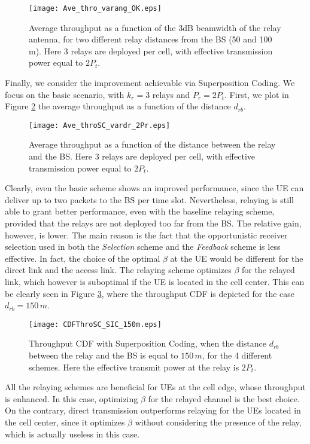 \documentclass[12pt, letterpaper, onecolumn, draftcls]{IEEEtran}
\newcommand{\figw}{0.55\columnwidth}
\begin{document}
\begin{figure}
    \centering
     \texttt{[image: Ave\_thro\_varang\_OK.eps]}
     \caption{\small Average throughput as a function of the 3dB beamwidth of the relay antenna, for two different relay distances from the BS (50 and 100 m). Here 3 relays are deployed per cell, with effective transmission power equal to $2P_t$.}
\label{fig:Ave_thro_varang}
\end{figure}

Finally, we consider the improvement achievable via Superposition Coding. We focus on the basic scenario, with $k_r=3$ relays and $P_r = 2P_t$. First, we plot in Figure \ref{fig:Ave_throSC_vardr_2Pr} the average throughput as a function of the distance $d_{rb}$.
\begin{figure}
    \centering
     \texttt{[image: Ave\_throSC\_vardr\_2Pr.eps]}
     \vspace{-0.5cm}
     \caption{\small Average throughput as a function of the distance between the relay and the BS. Here 3 relays are deployed per cell, with effective transmission power equal to $2P_t$.}
\label{fig:Ave_throSC_vardr_2Pr}
\end{figure}
Clearly, even the basic scheme shows an improved performance, since the UE can deliver up to two packets to the BS per time slot. Nevertheless, relaying is still able to grant better performance, even with the baseline relaying scheme, provided that the relays are not deployed too far from the BS.
The relative gain, however, is lower. The main reason is the fact that the opportunistic receiver selection used in both the \textit{Selection} scheme and the \textit{Feedback} scheme is less effective. In fact, the choice of the optimal $\beta$ at the UE would be different for the direct link and the access link. The relaying scheme optimizes $\beta$ for the relayed link, which however is suboptimal if the UE is located in the cell center.
This can be clearly seen in Figure \ref{fig:CDFThroSC_SIC_150m}, where the throughput CDF is depicted for the case $d_{rb} = 150\,m$.
\begin{figure}
    \centering
    \texttt{[image: CDFThroSC\_SIC\_150m.eps]}
      \vspace{-0.5cm}
     \caption{\small Throughput CDF with Superposition Coding, when the distance $d_{rb}$ between the relay and the BS is equal to $150\,m$, for the 4 different schemes. Here the effective transmit power at the relay is $2P_t$.}
  \label{fig:CDFThroSC_SIC_150m}
  \vspace{-1cm}
\end{figure}
All the relaying schemes are beneficial for UEs at the cell edge, whose throughput is enhanced. In this case, optimizing $\beta$ for the relayed channel is the best choice. On the contrary, direct transmission outperforms relaying for the UEs located in the cell center, since it optimizes $\beta$ without considering the presence of the relay, which is actually useless in this case.
\end{document}
